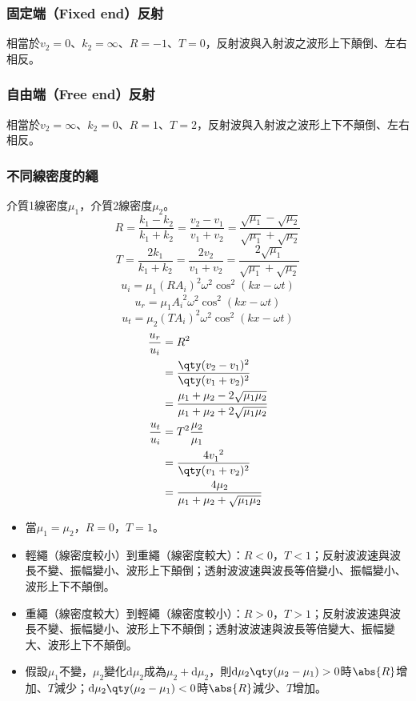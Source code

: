 \documentclass[a4paper,12pt]{report}
\begin{document}
\subsubsection{固定端（Fixed end）反射}
相當於$v_2=0$、$k_2=\infty$、$R=-1$、$T=0$，反射波與入射波之波形上下顛倒、左右相反。
\subsubsection{自由端（Free end）反射}
相當於$v_2=\infty$、$k_2=0$、$R=1$、$T=2$，反射波與入射波之波形上下不顛倒、左右相反。
\subsubsection{不同線密度的繩}
介質1線密度$\mu_1$，介質2線密度$\mu_2$。
\[ R = \frac{k_1-k_2}{k_1+k_2} = \frac{v_2-v_1}{v_1+v_2} = \frac{\sqrt{\mu_1}-\sqrt{\mu_2}}{\sqrt{\mu_1}+\sqrt{\mu_2}} \]
\[ T = \frac{2k_1}{k_1+k_2} = \frac{2v_2}{v_1+v_2} = \frac{2\sqrt{\mu_1}}{\sqrt{\mu_1}+\sqrt{\mu_2}} \]
\[ u_i = \mu_1 (R A_i)^2 \omega^2 \cos^2(kx - \omega t) \]
\[ u_r = \mu_1 A_i^{\phantom{i}2} \omega^2 \cos^2(kx - \omega t) \]
\[ u_t = \mu_2 (T A_i)^2 \omega^2 \cos^2(kx - \omega t) \]
\[\begin{aligned}
\frac{u_r}{u_i} &= R^2 \\
&= \frac{\qty(v_2-v_1)^2}{\qty(v_1+v_2)^2} \\
&= \frac{\mu_1+\mu_2-2\sqrt{\mu_1\mu_2}}{\mu_1+\mu_2+2\sqrt{\mu_1\mu_2}}\\
\frac{u_t}{u_i} &= T^2\frac{\mu_2}{\mu_1} \\
&= \frac{4v_1^{\phantom{1}2}}{\qty(v_1+v_2)^2} \\
&= \frac{4\mu_2}{\mu_1+\mu_2+\sqrt{\mu_1\mu_2}}
\end{aligned}\]
\begin{itemize}
\item 當$\mu_1=\mu_2$，$R=0$，$T=1$。
\item 輕繩（線密度較小）到重繩（線密度較大）：$R<0$，$T<1$；反射波波速與波長不變、振幅變小、波形上下顛倒；透射波波速與波長等倍變小、振幅變小、波形上下不顛倒。
\item 重繩（線密度較大）到輕繩（線密度較小）：$R>0$，$T>1$；反射波波速與波長不變、振幅變小、波形上下不顛倒；透射波波速與波長等倍變大、振幅變大、波形上下不顛倒。
\item 假設$\mu_1$不變，$\mu_2$變化$\mathrm{d}\mu_2$成為$\mu_2+\mathrm{d}\mu_2$，則$\mathrm{d}\mu_2\qty(\mu_2-\mu_1)>0$時$\abs{R}$增加、$T$減少；$\mathrm{d}\mu_2\qty(\mu_2-\mu_1)<0$時$\abs{R}$減少、$T$增加。
\end{itemize}
\end{document}
